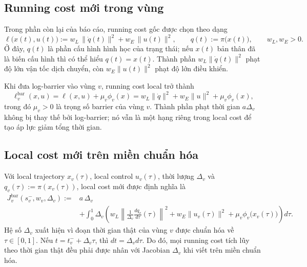 \documentclass[12pt]{article}
\begin{document}
\subsection{Running cost mới trong vùng}

Trong phần còn lại của báo cáo, running cost gốc được chọn theo dạng
\begin{equation}
\ell\bigl(x(t),u(t)\bigr)
:=
w_L\,\|\dot q(t)\|^2+w_E\,\|u(t)\|^2,
\qquad
q(t):=\pi\bigl(x(t)\bigr),
\qquad
w_L,w_E>0.
\label{eq:running_cost_choice}
\end{equation}
Ở đây, $q(t)$ là phần cấu hình hình học của trạng thái; nếu $x(t)$ bản thân đã là biến cấu hình thì có thể hiểu $q(t)=x(t)$. Thành phần $w_L\|\dot q(t)\|^2$ phạt độ lớn vận tốc dịch chuyển, còn $w_E\|u(t)\|^2$ phạt độ lớn điều khiển.

Khi đưa log-barrier vào vùng $v$, running cost local trở thành
\begin{equation}
\ell_v^{\mathrm{bar}}(x,u)
=
\ell(x,u)+\mu_v\phi_v(x)
=
w_L\|\dot q\|^2+w_E\|u\|^2+
\mu_v\phi_v(x),
\label{eq:bar_running_cost_region}
\end{equation}
trong đó $\mu_v>0$ là trọng số barrier của vùng $v$. Thành phần phạt thời gian $a\Delta_v$ không bị thay thế bởi log-barrier; nó vẫn là một hạng riêng trong local cost để tạo áp lực giảm tổng thời gian.

\subsection{Local cost mới trên miền chuẩn hóa}

Với local trajectory $x_v(\tau)$, local control $u_v(\tau)$, thời lượng $\Delta_v$ và $q_v(\tau):=\pi(x_v(\tau))$, local cost mới được định nghĩa là
\begin{equation}
\begin{aligned}
J_v^{\mathrm{bar}}(s_v^-,w_v,\Delta_v)
:={}& a\,\Delta_v \\
&+\int_0^1 \Delta_v\left(
w_L\left\|\frac{1}{\Delta_v}\frac{dq_v}{d\tau}(\tau)\right\|^2
+w_E\|u_v(\tau)\|^2
+\mu_v\phi_v\bigl(x_v(\tau)\bigr)
\right)d\tau .
\end{aligned}
\label{eq:local_cost_barrier}
\end{equation}
Hệ số $\Delta_v$ xuất hiện vì đoạn thời gian thật của vùng $v$ được chuẩn hóa về $\tau\in[0,1]$. Nếu $t=t_v^-+\Delta_v\tau$, thì $dt=\Delta_v d\tau$. Do đó, mọi running cost tích lũy theo thời gian thật đều phải được nhân với Jacobian $\Delta_v$ khi viết trên miền chuẩn hóa.
\end{document}
